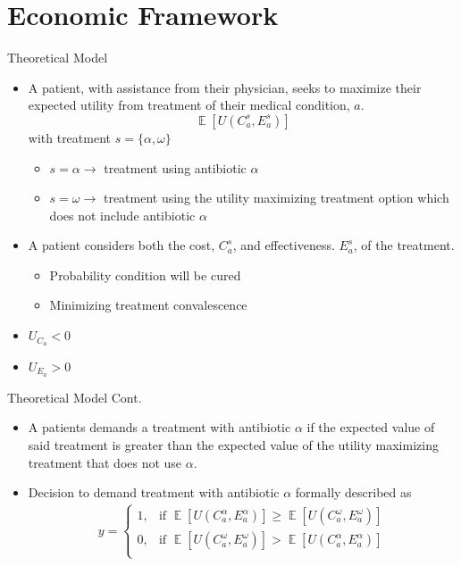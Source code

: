 \documentclass{beamer}
\DeclareMathOperator{\EX}{\mathbb{E}}
\begin{document}
\section{Economic Framework}
\begin{frame}{Theoretical Model}
\begin{itemize}
\item A patient, with assistance from their physician, seeks to maximize their expected utility from treatment of their medical condition, $a$.
\begin{equation}
\EX[U(C_a^s,E_a^s)]
\end{equation}
with treatment $s = \{\alpha,\omega\}$
\begin{itemize}
  \item $s = \alpha \rightarrow$ treatment using antibiotic $\alpha$
  \item $s = \omega \rightarrow$ treatment using the utility maximizing treatment option which does not include antibiotic $\alpha$
\end{itemize}
\item A patient considers both the cost, $C_a^s$, and effectiveness. $E_a^s$, of the treatment.
  \begin{itemize}
    \item Probability condition will be cured
    \item Minimizing treatment convalescence
  \end{itemize}
\item $U_{C_a} < 0$
\item $U_{E_a} > 0$
\end{itemize}
\end{frame}

\begin{frame}{Theoretical Model Cont.}
\begin{itemize}
\item A patients demands a treatment with antibiotic $\alpha$ if the expected value of said treatment is greater than the expected value of the utility maximizing treatment that does not use $\alpha$.
\item Decision to demand treatment with antibiotic $\alpha$ formally described as
\begin{eqnarray}
  y =
  \begin{cases}
    1, & \text{if }\EX[U(C_a^\alpha,E_a^\alpha)] \geq \EX[U(C_a^\omega,E_a^\omega)] \\
    0, & \text{if }\EX[U(C_a^\omega,E_a^\omega)] > \EX[U(C_a^\alpha,E_a^\alpha)] \\
  \end{cases}
\end{eqnarray}
\end{itemize}
\end{frame}
\end{document}
